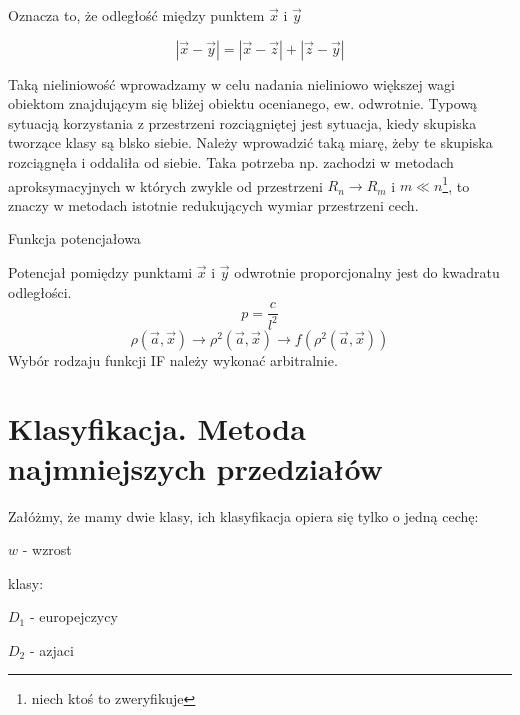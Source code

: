 \documentclass[a4paper,10pt]{article}
\begin{document}
Oznacza to, że odległość między punktem $\overrightarrow{x}$ i $\overrightarrow{y}$

\begin{equation}
|\overrightarrow{x} - \overrightarrow{y}| = |\overrightarrow{x} - \overrightarrow{z}| + |\overrightarrow{z} - \overrightarrow{y}|
\end{equation}

Taką nieliniowość wprowadzamy w celu nadania nieliniowo większej wagi obiektom znajdującym się bliżej obiektu ocenianego, ew. odwrotnie. Typową sytuacją korzystania z przestrzeni rozciągniętej jest sytuacja, kiedy skupiska tworzące klasy są blsko siebie. Należy wprowadzić taką miarę, żeby te skupiska rozciągnęła i oddaliła od siebie. Taka potrzeba np. zachodzi w metodach aproksymacyjnych w których zwykle od przestrzeni $R_n \rightarrow R_m$ i $m \ll n$\footnote{niech ktoś to zweryfikuje}, to znaczy w metodach istotnie redukujących wymiar przestrzeni cech.

Funkcja potencjałowa

Potencjał pomiędzy punktami $\overrightarrow{x}$ i $\overrightarrow{y}$ odwrotnie proporcjonalny jest do kwadratu odległości.
\begin{equation}
p = \frac{c}{l^2}
\end{equation}
\begin{equation}
\rho(\overrightarrow{a}, \overrightarrow{x}) \rightarrow \rho^2(\overrightarrow{a}, \overrightarrow{x}) \rightarrow f(\rho^2(\overrightarrow{a}, \overrightarrow{x}))
\end{equation}
Wybór rodzaju funkcji IF należy wykonać arbitralnie.

\section{Klasyfikacja. Metoda najmniejszych przedziałów}
Załóżmy, że mamy dwie klasy, ich klasyfikacja opiera się tylko o jedną cechę:

$w$ - wzrost

klasy:

$D_1$ - europejczycy

$D_2$ - azjaci
\end{document}
